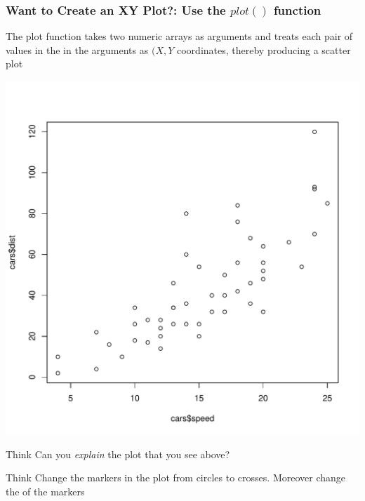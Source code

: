 \subsubsection{Want to Create an XY Plot?: Use the $plot()$ function}
\noindent The plot function takes two numeric arrays as arguments and treats each pair of values in the in the arguments as $(X,Y$ coordinates, thereby producing a scatter plot 
\begin{knitrout}
\color{fgcolor}\begin{kframe}
\begin{alltt}
\hlopt{$}\hlopt{$}
\end{alltt}
\end{kframe}
\includegraphics[width=\maxwidth]{figure/plot-1} 

\end{knitrout}

\begin{DIY}{Think}
Can you \emph{explain} the plot that you see above?
\end{DIY}

\begin{DIY}{Think}
Change the markers in the plot from circles to crosses. Moreover change the of the markers
\end{DIY}

